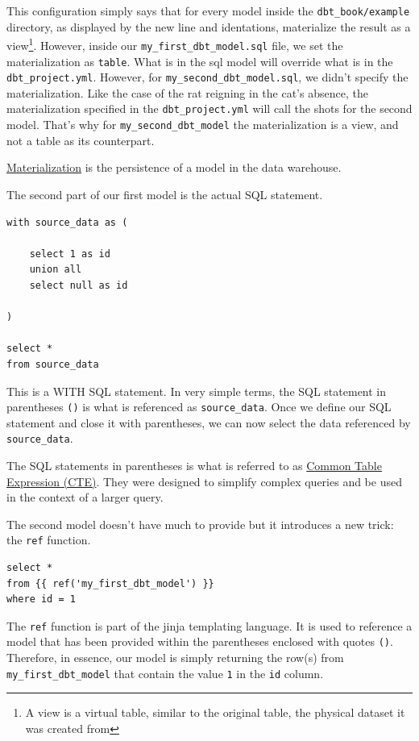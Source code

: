 \documentclass[
]{book}
\begin{document}
This configuration simply says that for every model inside the \texttt{dbt\_book/example} directory, as displayed by the new line and identations, materialize the result as a view\footnote{A view is a virtual table, similar to the original table, the physical dataset it was created from}. However, inside our \texttt{my\_first\_dbt\_model.sql} file, we set the materialization as \texttt{table}. What is in the sql model will override what is in the \texttt{dbt\_project.yml}. However, for \texttt{my\_second\_dbt\_model.sql}, we didn't specify the materialization. Like the case of the rat reigning in the cat's absence, the materialization specified in the \texttt{dbt\_project.yml} will call the shots for the second model. That's why for \texttt{my\_second\_dbt\_model} the materialization is a view, and not a table as its counterpart.

\href{https://docs.getdbt.com/docs/build/materializations}{Materialization} is the persistence of a model in the data warehouse.

The second part of our first model is the actual SQL statement.

\begin{verbatim}
with source_data as (

    select 1 as id
    union all
    select null as id

)

select *
from source_data
\end{verbatim}

This is a WITH SQL statement. In very simple terms, the SQL statement in parentheses \texttt{()} is what is referenced as \texttt{source\_data}. Once we define our SQL statement and close it with parentheses, we can now select the data referenced by \texttt{source\_data}.

The SQL statements in parentheses is what is referred to as \href{https://www.atlassian.com/data/sql/using-common-table-expressions}{Common Table Expression (CTE)}. They were designed to simplify complex queries and be used in the context of a larger query.

The second model doesn't have much to provide but it introduces a new trick: the \texttt{ref} function.

\begin{verbatim}
select *
from {{ ref('my_first_dbt_model') }}
where id = 1
\end{verbatim}

The \texttt{ref} function is part of the jinja templating language. It is used to reference a model that has been provided within the parentheses enclosed with quotes \texttt{(\textquotesingle{}\textquotesingle{})}. Therefore, in essence, our model is simply returning the row(s) from \texttt{my\_first\_dbt\_model} that contain the value \texttt{1} in the \texttt{id} column.
\end{document}
